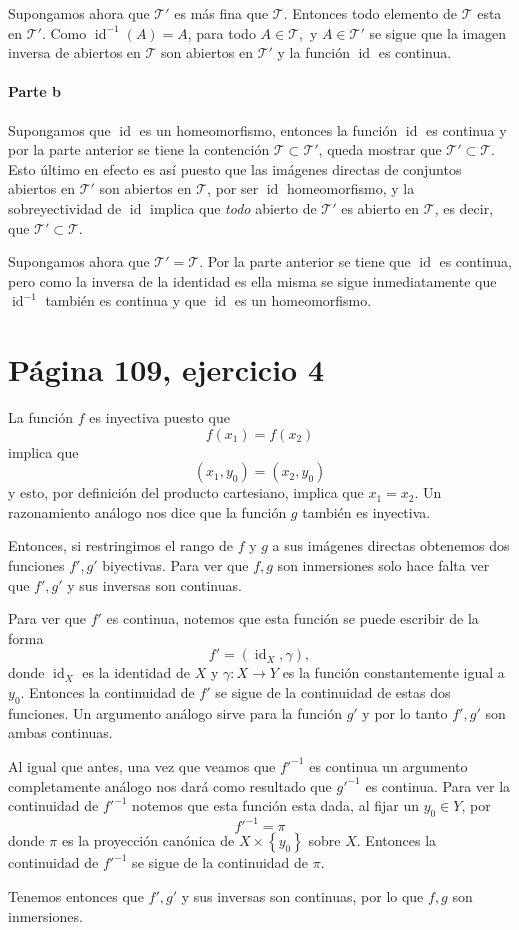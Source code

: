 \documentclass[mid,fleqn,final,oneside]{tareas}
\DeclareMathOperator{\id}{id}
\begin{document}
Supongamos ahora que $ \mathcal{T}' $ es más fina que $
\mathcal{T}$. Entonces todo elemento de $ \mathcal{T} $
esta en $ \mathcal{T}' $. Como $ \id^{-1}(A)=A $, para
todo $A\in \mathcal{T}, $ y $ A\in\mathcal{T}' $ se
sigue que la imagen inversa de abiertos en $
\mathcal{T} $ son abiertos en $ \mathcal{T}' $ y la
función $ \id $ es continua.

\paragraph{Parte b}%
\label{par:parte_b}

Supongamos que $\id$ es un homeomorfismo, entonces la
función $\id$ es continua y por la parte anterior se
tiene la contención $\mathcal{T}\subset\mathcal{T}'$,
queda mostrar que $\mathcal{T}'\subset\mathcal{T}.$
Esto último en efecto es así puesto que las imágenes directas
de conjuntos abiertos en $\mathcal{T}'$ son abiertos en
$\mathcal{T}$, por ser $\id$ homeomorfismo, y la
sobreyectividad de $\id$ implica que \emph{todo} abierto
de $\mathcal{T}'$ es abierto en $\mathcal{T}$, es
decir, que $\mathcal{T}'\subset\mathcal{T}$.

Supongamos ahora que $\mathcal{T}'=\mathcal{T}$. Por la
parte anterior se tiene que $\id$ es continua, pero como la
inversa de la identidad es ella misma se sigue
inmediatamente que $\id^{-1}$ también es continua y que
$\id$ es un homeomorfismo.

\section*{Página 109, ejercicio 4}

La función $f$ es inyectiva puesto que
\[
	f(x_1)=f(x_2)
\]
implica que
\[
	(x_1,y_0)=(x_2,y_0)
\]
y esto, por definición del producto cartesiano, implica
que $x_1=x_2$. Un razonamiento análogo nos dice que la
función $g$ también es inyectiva.

Entonces, si restringimos el rango de $f$ y $g$ a sus
imágenes directas obtenemos dos funciones $f',g'$
biyectivas. Para ver que $f,g$ son inmersiones solo
hace falta ver que $f',g'$ y sus inversas son
continuas.

Para ver que $f'$ es continua, notemos que esta función
se puede escribir de la forma
\[
	f'=(\id_X,\gamma),
\]
donde $\id_X$ es la identidad de $X$ y $\gamma:X\to Y$ 
es la función constantemente igual a $y_0$.
\normalmarginpar{}
Entonces la continuidad de $f'$ se sigue de la
continuidad de estas dos funciones. Un argumento
análogo sirve para la función $g'$ y por lo tanto
$f',g'$ son ambas continuas.

Al igual que antes, una vez que veamos que $f'^{-1}$ es
continua un argumento completamente análogo nos dará
como resultado que $g'^{-1}$ es continua. Para ver la
continuidad de $f'^{-1}$ notemos que esta función esta
dada, al fijar un $y_0\in Y$, por
\[
	f'^{-1}=\pi	
\]
donde $\pi$ es la proyección canónica de $X\times\left\{ y_0 \right\}$
sobre $X$. Entonces la continuidad de $f'^{-1}$ se
sigue de la continuidad de $\pi$.

Tenemos entonces que $f',g'$ y sus inversas son
continuas, por lo que $f,g$ son inmersiones.
\end{document}
